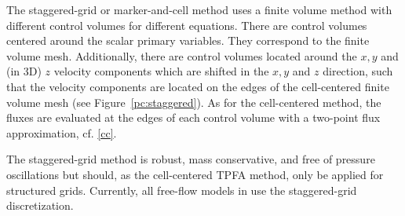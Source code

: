 The staggered-grid or marker-and-cell method uses a finite volume method with different control volumes for different equations. There are control volumes centered around the scalar primary variables. They correspond to the finite volume mesh. Additionally, there are control volumes located around the $x,y$ and (in 3D) $z$ velocity components which are shifted in the $x,y$ and $z$ direction, such that the velocity components are located on the edges of the cell-centered finite volume mesh (see Figure~\ref{pc:staggered}). As for the cell-centered method, the fluxes are evaluated at the edges of each control volume with a two-point flux approximation, cf. \ref{cc}.\par
The staggered-grid method is robust, mass conservative, and free of pressure oscillations
but should, as the cell-centered TPFA method, only be applied for structured grids.
Currently, all free-flow models in \Dumux use the staggered-grid discretization.

